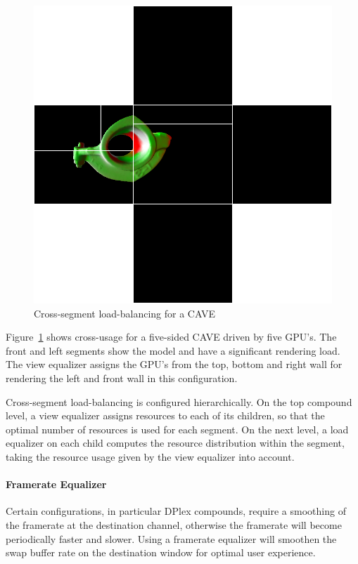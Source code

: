 \documentclass[10pt,a4]{scrartcl}
\newcommand{\fig}[1]{Figure~\ref{#1}}
\begin{document}
\begin{figure} 
    \includegraphics[width=.382\textwidth]{images/viewLB.png}
    {\caption{\label{fViewLoadBalancing2}\small Cross-segment
        load-balancing for a CAVE}}
\end{figure}
\fig{fViewLoadBalancing2} shows cross-usage for a five-sided CAVE driven
by five GPU's. The front and left segments show the model and have a
significant rendering load. The view equalizer assigns the GPU's from
the top, bottom and right wall for rendering the left and front wall in
this configuration.

Cross-segment load-balan\-cing is configured hierarchically. On the top
compound level, a view equalizer assigns resources to each of its
children, so that the optimal number of resources is used for each
segment. On the next level, a load equalizer on each child computes the
resource distribution within the segment, taking the resource usage
given by the view equalizer into account.

\paragraph{Framerate Equalizer}
Certain configurations, in particular DPlex compounds, require a
smoothing of the framerate at the destination channel, otherwise the
framerate will become periodically faster and slower. Using a framerate
equalizer will smoothen the swap buffer rate on the destination window
for optimal user experience.
\end{document}
